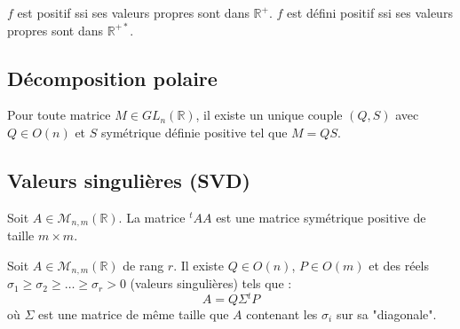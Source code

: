 \documentclass[french]{yLectureNote}
\begin{document}
\begin{proposition}
    $f$ est positif ssi ses valeurs propres sont dans $\mathbb{R}^+$.
    $f$ est défini positif ssi ses valeurs propres sont dans $\mathbb{R}^{+*}$.
\end{proposition}

\subsection{Décomposition polaire}
\begin{theorem}
    Pour toute matrice $M \in GL_n(\mathbb{R})$, il existe un unique couple $(Q, S)$ avec $Q \in O(n)$ et $S$ symétrique définie positive tel que $M = QS$.
\end{theorem}

\subsection{Valeurs singulières (SVD)}
\begin{lemma}
    Soit $A \in \mathcal{M}_{n,m}(\mathbb{R})$. La matrice ${}^tAA$ est une matrice symétrique positive de taille $m \times m$.
\end{lemma}

\begin{theorem}[SVD]
    Soit $A \in \mathcal{M}_{n,m}(\mathbb{R})$ de rang $r$. Il existe $Q \in O(n)$, $P \in O(m)$ et des réels $\sigma_1 \ge \sigma_2 \ge \dots \ge \sigma_r > 0$ (valeurs singulières) tels que :
    $$A = Q \Sigma {}^tP$$
    où $\Sigma$ est une matrice de même taille que $A$ contenant les $\sigma_i$ sur sa "diagonale".
\end{theorem}


\end{document}
